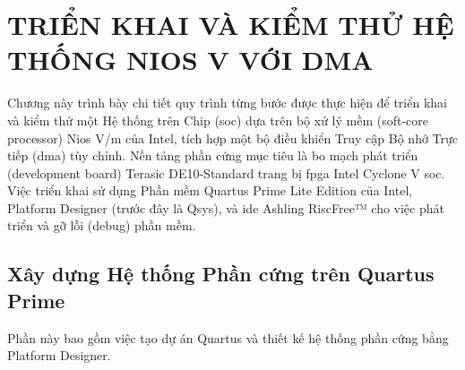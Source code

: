 \chapter{TRIỂN KHAI VÀ KIỂM THỬ HỆ THỐNG NIOS V VỚI DMA}
\label{Chapter3} %

Chương này trình bày chi tiết quy trình từng bước được thực hiện để triển khai và kiểm thử một Hệ thống trên Chip (\acrshort{soc}) dựa trên bộ xử lý mềm (soft-core processor) Nios V/m của Intel, tích hợp một bộ điều khiển Truy cập Bộ nhớ Trực tiếp (\acrfull{dma}) tùy chỉnh. Nền tảng phần cứng mục tiêu là bo mạch phát triển (development board) Terasic DE10-Standard trang bị \acrshort{fpga} Intel Cyclone V \acrshort{soc}. Việc triển khai sử dụng Phần mềm Quartus Prime Lite Edition của Intel, Platform Designer (trước đây là Qsys), và \acrshort{ide} Ashling RiscFree™ cho việc phát triển và gỡ lỗi (debug) phần mềm.

\section{Xây dựng Hệ thống Phần cứng trên Quartus Prime}
\label{sec:build_hardware}

Phần này bao gồm việc tạo dự án Quartus và thiết kế hệ thống phần cứng bằng Platform Designer.

